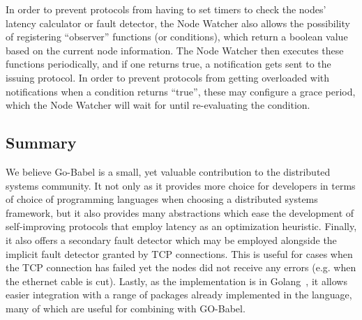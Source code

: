 In order to prevent protocols from having to set timers to check the nodes' latency calculator or fault detector, the Node Watcher also allows the possibility of registering ``observer'' functions (or conditions), which return a boolean value based on the current node information. The Node Watcher then executes these functions periodically, and if one returns true, a notification gets sent to the issuing protocol. In order to prevent protocols from getting overloaded with notifications when a condition returns ``true'', these may configure a grace period, which the Node Watcher will wait for until re-evaluating the condition.

\subsection{Summary}

We believe Go-Babel is a small, yet valuable contribution to the distributed systems community. It not only as it provides more choice for developers in terms of choice of programming languages when choosing a distributed systems framework, but it also provides many abstractions which ease the development of self-improving protocols that employ latency as an optimization heuristic. Finally, it also offers a secondary fault detector which may be employed alongside the implicit fault detector granted by TCP connections. This is useful for cases when the TCP connection has failed yet the nodes did not receive any errors (e.g. when the ethernet cable is cut). Lastly, as the implementation is in Golang~\cite{golang}, it allows easier integration with a range of packages already implemented in the language, many of which are useful for combining with GO-Babel. 

